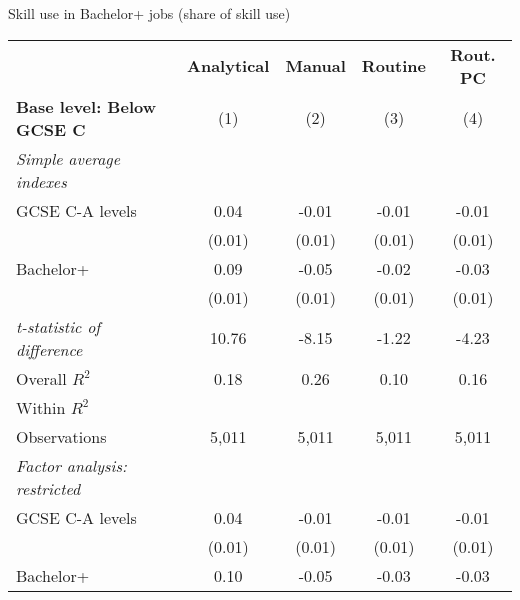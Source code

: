 \begin{center}
\begin{threeparttable}[!h]
\caption{Skill use in Bachelor+ jobs (share of skill use)}
\label{tab:skillRegs}
\begin{tabular}{lcccc}
\toprule
\toprule
&\multicolumn{1}{c}{\textbf{Analytical}}&\multicolumn{1}{c}{\textbf{Manual}}&\multicolumn{1}{c}{\textbf{Routine}}&\multicolumn{1}{c}{\textbf{Rout. PC}} \\
\textbf{Base level: Below GCSE C}&\multicolumn{1}{c}{(1)}&\multicolumn{1}{c}{(2)}&\multicolumn{1}{c}{(3)}&\multicolumn{1}{c}{(4)} \\
\midrule
\textit{Simple average indexes}\vspace{1mm} \\ 
\hspace{3mm}GCSE C-A levels&        0.04\sym{**} &       -0.01         &       -0.01         &       -0.01         \\
                    &      (0.01)         &      (0.01)         &      (0.01)         &      (0.01)         \\
\hspace{3mm}Bachelor+&        0.09\sym{***}&       -0.05\sym{***}&       -0.02         &       -0.03\sym{**} \\
                    &      (0.01)         &      (0.01)         &      (0.01)         &      (0.01)         \\
\textit{t-statistic of difference}&       10.76         &       -8.15         &       -1.22         &       -4.23         \\
\midrule Overall $ R^2$&        0.18         &        0.26         &        0.10         &        0.16         \\
Within $ R^2$       &                     &                     &                     &                     \\
Observations        &       5,011         &       5,011         &       5,011         &       5,011         \\
\midrule \vspace{1mm}\textit{Factor analysis: restricted} \\ 
\hspace{3mm}GCSE C-A levels&        0.04\sym{**} &       -0.01         &       -0.01         &       -0.01         \\
                    &      (0.01)         &      (0.01)         &      (0.01)         &      (0.01)         \\
\hspace{3mm}Bachelor+&        0.10\sym{***}&       -0.05\sym{***}&       -0.03\sym{**} &       -0.03\sym{**} \\

\end{tabular}
\end{threeparttable}
\end{center}
